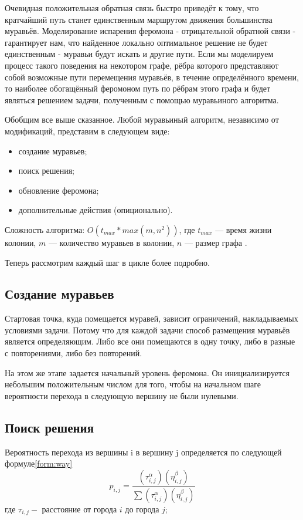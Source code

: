 \documentclass[12pt]{report}
\begin{document}
Очевидная положительная обратная связь быстро приведёт к тому, что кратчайший путь станет единственным маршрутом движения большинства муравьёв. Моделирование испарения феромона - отрицательной обратной связи - гарантирует нам, что найденное локально оптимальное решение не будет единственным - муравьи будут искать и другие пути. Если мы моделируем процесс такого поведения на некотором графе, рёбра которого представляют собой возможные пути перемещения муравьёв, в течение определённого времени, то наиболее обогащённый феромоном путь по рёбрам этого графа и будет являться решением задачи, полученным с помощью муравьиного алгоритма.

Обобщим все выше сказанное. Любой муравьиный алгоритм, независимо от модификаций, представим в следующем виде:
\begin{itemize}
	\item создание муравьев;
	\item поиск решения;
	\item обновление феромона;
	\item дополнительные действия (опиционально).
\end{itemize}

Сложность алгоритма: $O(t_{max} * max(m, n^2))$, где $t_{max}$ --- время жизни колонии, $m$ --- количество муравьев в колонии, $n$ --- размер графа \cite{shtovba}.

Теперь рассмотрим каждый шаг в цикле более подробно.

\subsection{Создание муравьев}

Стартовая точка, куда помещается муравей, зависит ограничений,   накладываемых условиями задачи. Потому что для каждой задачи   способ размещения муравьёв является определяющим. Либо все    они помещаются в одну точку, либо в разные с повторениями, либо без повторений.

На этом же этапе задается начальный уровень феромона. Он    инициализируется небольшим положительным числом для того,    чтобы на начальном шаге вероятности перехода в следующую    вершину не были нулевыми. 
  
\subsection{Поиск решения}

 Вероятность перехода из вершины i в вершину j определяется по следующей формуле\ref{form:way}\\   
\begin{equation}\label{form:way} 
 p_{i,j}={\frac {(\tau _{i,j}^{\alpha })(\eta _{i,j}^{\beta })}{\sum (\tau _{i,j}^{\alpha })(\eta _{i,j}^{\beta })}}
 \end{equation}
    где \quad$ \tau _{i,j} - $ расстояние от города $i$ до города $j$;
    
\end{document}
